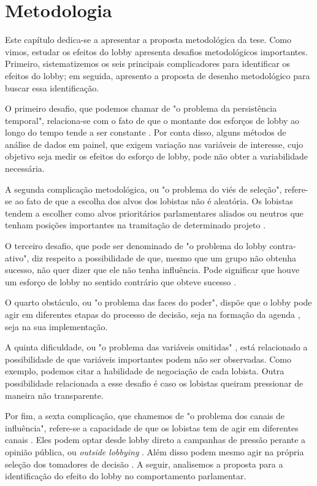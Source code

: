 \chapter{Metodologia}
\label{chapter:metodologia}
Este capítulo dedica-se a apresentar a proposta metodológica da tese. Como vimos, estudar os efeitos do lobby apresenta desafios metodológicos importantes. Primeiro, sistematizemos os seis principais complicadores para identificar os efeitos do lobby; em seguida, apresento a proposta de desenho metodológico para buscar essa identificação.

O primeiro desafio, que podemos chamar de "o problema da persistência temporal", relaciona-se com o fato de que o montante dos esforços de lobby ao longo do tempo tende a ser constante \cite{de_figueiredo_advancing_2014}. Por conta disso, alguns métodos de análise de dados em painel, que exigem variação nas variáveis de interesse, cujo objetivo seja medir os efeitos do esforço de lobby, pode não obter a variabilidade necessária.

A segunda complicação metodológica, ou "o problema do viés de seleção", refere-se ao fato de que a escolha dos alvos dos lobistas não é aleatória. Os lobistas tendem a escolher como alvos prioritários parlamentares aliados \cite{kollman1998outside, caldeira2000lobbying, hojnacki2001pac} ou neutros \cite{holyoke2003choosing, kelleher2009political, bertrand2014whom, gawande2012lobbying} que tenham posições importantes na tramitação de determinado projeto \cite{marshall2010lobby}.

O terceiro desafio, que pode ser denominado de "o problema do lobby contra-ativo", diz respeito a possibilidade de que, mesmo que um grupo não obtenha sucesso, não quer dizer que ele não tenha influência. Pode significar que houve um esforço de lobby no sentido contrário que obteve sucesso \cite{austen1996theory}.

O quarto obstáculo, ou "o problema das faces do poder", dispõe que o lobby pode agir em diferentes etapas do processo de decisão, seja na formação da agenda \cite{bachrach1962two}, seja na sua implementação.

A quinta dificuldade, ou "o problema das variáveis omitidas" \cite{de_figueiredo_advancing_2014}, está relacionado a possibilidade de que variáveis importantes podem não ser observadas. Como exemplo, podemos citar a habilidade de negociação de cada lobista. Outra possibilidade relacionada a esse desafio é caso os lobistas queiram pressionar de maneira não transparente.

Por fim, a sexta complicação, que chamemos de "o problema dos canais de influência", refere-se a capacidade de que os lobistas tem de agir em diferentes canais \cite{dur_measuring_2008}. Eles podem optar desde lobby direto a campanhas de pressão perante a opinião pública, ou \textit{outside lobbying} \cite{kollman1998outside}. Além disso podem mesmo agir na própria seleção dos tomadores de decisão \cite{fordham2003selection}. A seguir, analisemos a proposta para a identificação do efeito do lobby no comportamento parlamentar.




